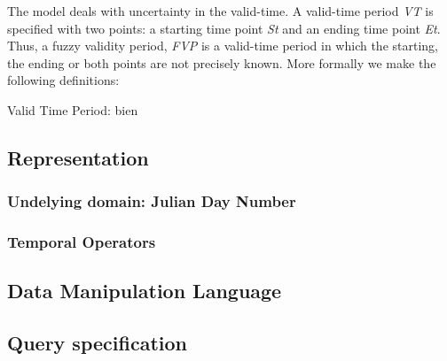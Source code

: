%
%
The model deals with uncertainty in the valid-time. A valid-time period  \emph{VT} is specified with two points: a starting time point \emph{St} and an ending time point \emph{Et}. Thus, a fuzzy validity period, \emph{FVP} is a valid-time period in which the starting, the ending or both points are not precisely known. More formally we make the following definitions:

\begin{definition}
Valid Time Period: bien
\end{definition}

\subsection{Representation}

\subsubsection{Undelying domain: Julian Day Number}

\subsubsection{Temporal Operators}

\subsection{Data Manipulation Language}




\subsection{Query specification}

\begin{example}

\end{example}
